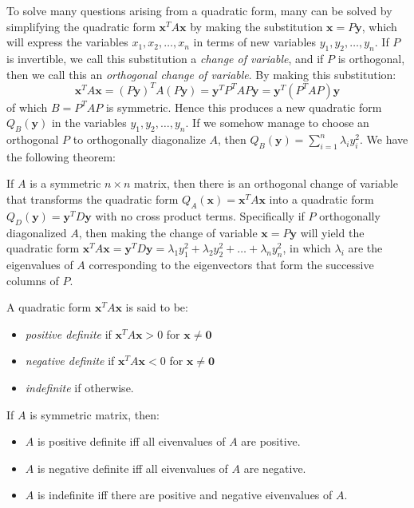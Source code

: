 \documentclass{report}
\begin{document}
		To solve many questions arising from a quadratic form, many can be solved by simplifying the quadratic form $\bm{x}^TA\bm{x}$ by making the substitution $\bm{x}=P\bm{y}$, which will express the variables $x_1, x_2, \dots, x_n$ in terms of new variables $y_1, y_2, \dots, y_n$. If $P$ is invertible, we call this substitution a \emph{change of variable}, and if $P$ is orthogonal, then we call this an \emph{orthogonal change of variable}. By making this substitution:
		\begin{displaymath}
		\bm{x}^TA\bm{x}=(P\bm{y})^TA(P\bm{y})=\bm{y}^TP^TAP\bm{y}=\bm{y}^T(P^TAP)\bm{y}
		\end{displaymath}
		of which $B=P^TAP$ is symmetric. Hence this produces a new quadratic form $Q_B(\bm{y})$ in the variables $y_1, y_2, \dots, y_n$. If we somehow manage to choose an orthogonal $P$ to orthogonally diagonalize $A$, then $Q_B(\bm{y})=\sum_{i=1}^{n}\lambda_iy_i^2$. We have the following theorem:
		\begin{thm}
			If $A$ is a symmetric $n \times n$ matrix, then there is an orthogonal change of variable that transforms the quadratic form $Q_A(\bm{x})=\bm{x}^TA\bm{x}$ into a quadratic form $Q_D(\bm{y})=\bm{y}^TD\bm{y}$ with no cross product terms. Specifically if $P$ orthogonally diagonalized $A$, then making the change of variable $\bm{x}=P\bm{y}$ will yield the quadratic form $\bm{x}^TA\bm{x}=\bm{y}^TD\bm{y}=\lambda_1y_1^2+\lambda_2y_2^2+\dots+\lambda_ny_n^2$, in which $\lambda_i$ are the eigenvalues of $A$ corresponding to the eigenvectors that form the successive columns of $P$.
		\end{thm}
		
		\begin{defn}
			A quadratic form $\bm{x}^TA\bm{x}$ is said to be:
			\begin{itemize}
				\item \emph{positive definite} if $\bm{x}^TA\bm{x}>0$ for $\bm{x} \ne \bm{0}$
				\item \emph{negative definite} if $\bm{x}^TA\bm{x}<0$ for $\bm{x} \ne \bm{0}$
				\item \emph{indefinite} if otherwise.
			\end{itemize}
		\end{defn}
		
		\begin{thm}
			If $A$ is symmetric matrix, then:
			\begin{itemize}
				\item $A$ is positive definite iff all eivenvalues of $A$ are positive.
				\item $A$ is negative definite iff all eivenvalues of $A$ are negative.
				\item $A$ is indefinite iff there are positive and negative eivenvalues of $A$.
			\end{itemize}
		\end{thm}
		
\end{document}
